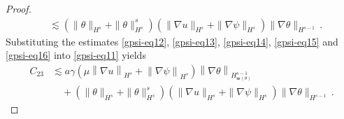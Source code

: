 \documentclass[10pt,a4paper]{amsart}
\def\w{\mathfrak{w}}
\begin{document}
\begin{proof}
\begin{equation}
\begin{aligned}
&\lesssim \left( \|\theta\|_{H^s} + \|\theta\|_{H^s}^s \right) \left( \|\nabla u\|_{H^s} + \|\nabla \psi\|_{H^s} \right) \|\nabla \theta\|_{H^{s-1}} \,.
\end{aligned}
\end{equation}
Substituting the estimates \eqref{gpsi-eq12}, \eqref{gpsi-eq13}, \eqref{gpsi-eq14}, \eqref{gpsi-eq15} and \eqref{gpsi-eq16} into \eqref{gpsi-eq11} yields
\begin{equation}\label{gpsi-eq17}
\begin{aligned}
C_{23} &\lesssim a \gamma \left( \mu \left\| \nabla u \right\|_{H^s} + \left\| \nabla \psi \right\|_{H^s} \right) \left\| \nabla \theta \right\|_{H^{s-1}_{\w (\theta)}} \\
&\quad + \left( \|\theta\|_{H^s} + \|\theta\|_{H^s}^s \right) \left( \|\nabla u\|_{H^s} + \|\nabla \psi\|_{H^s} \right) \|\nabla \theta\|_{H^{s-1}} \,.
\end{aligned}
\end{equation}


\end{proof}
\end{document}
